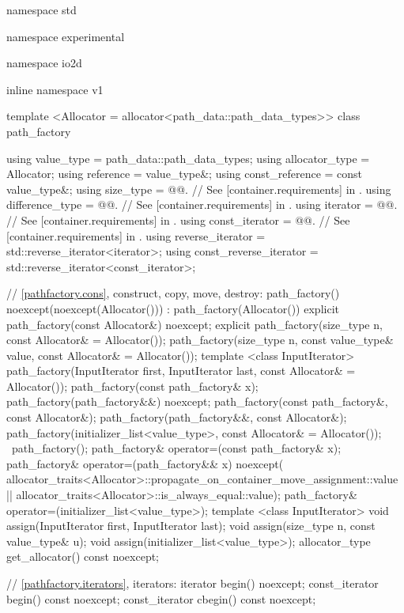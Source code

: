 \begin{codeblock}
namespace std { namespace experimental { namespace io2d { inline namespace v1 {
  template <Allocator = allocator<path_data::path_data_types>>
  class path_factory {
    using value_type = path_data::path_data_types;
    using allocator_type = Allocator;
    using reference = value_type&;
    using const_reference = const value_type&;
    using size_type       = @@. // See [container.requirements] in \cppseventeen.
    using difference_type = @@. // See [container.requirements] in \cppseventeen.
    using iterator       = @@. // See [container.requirements] in \cppseventeen.
    using const_iterator = @@. // See [container.requirements] in \cppseventeen.
    using reverse_iterator       = std::reverse_iterator<iterator>;
    using const_reverse_iterator = std::reverse_iterator<const_iterator>;
    
    // \ref{pathfactory.cons}, construct, copy, move, destroy:
    path_factory() noexcept(noexcept(Allocator())) :
      path_factory(Allocator()) { }
    explicit path_factory(const Allocator&) noexcept;
    explicit path_factory(size_type n, const Allocator& = Allocator());
    path_factory(size_type n, const value_type& value,
      const Allocator& = Allocator());
    template <class InputIterator>
    path_factory(InputIterator first, InputIterator last,
      const Allocator& = Allocator());
    path_factory(const path_factory& x);
    path_factory(path_factory&&) noexcept;
    path_factory(const path_factory&, const Allocator&);
    path_factory(path_factory&&, const Allocator&);
    path_factory(initializer_list<value_type>, const Allocator& = Allocator());
    ~path_factory();
    path_factory& operator=(const path_factory& x);
    path_factory& operator=(path_factory&& x)
      noexcept(
      allocator_traits<Allocator>::propagate_on_container_move_assignment::value
      ||
      allocator_traits<Allocator>::is_always_equal::value);
    path_factory& operator=(initializer_list<value_type>);
    template <class InputIterator>
    void assign(InputIterator first, InputIterator last);
    void assign(size_type n, const value_type& u);
    void assign(initializer_list<value_type>);
    allocator_type get_allocator() const noexcept;
    
    // \ref{pathfactory.iterators}, iterators:
    iterator begin() noexcept;
    const_iterator begin() const noexcept;
    const_iterator cbegin() const noexcept;

}}}}}
\end{codeblock}
